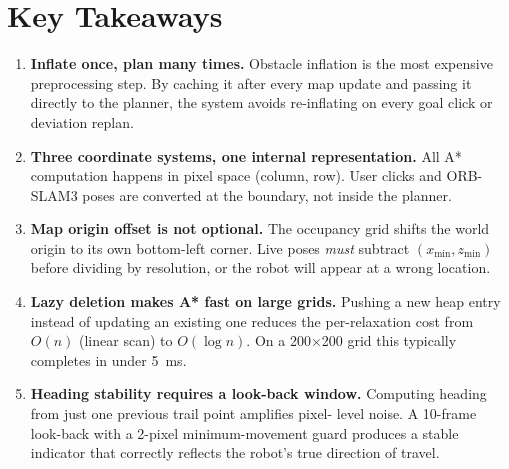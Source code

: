 \documentclass[12pt,a4paper]{article}
\begin{document}
\section{Key Takeaways}

\begin{enumerate}[label=\textbf{\arabic*.}]

  \item \textbf{Inflate once, plan many times.}
        Obstacle inflation is the most expensive preprocessing step.
        By caching it after every map update and passing it directly to the
        planner, the system avoids re-inflating on every goal click or
        deviation replan.

  \item \textbf{Three coordinate systems, one internal representation.}
        All A* computation happens in pixel space (column, row).
        User clicks and ORB-SLAM3 poses are converted at the boundary,
        not inside the planner.

  \item \textbf{Map origin offset is not optional.}
        The occupancy grid shifts the world origin to its own bottom-left
        corner. Live poses \emph{must} subtract $(x_{\min}, z_{\min})$ before
        dividing by resolution, or the robot will appear at a wrong location.

  \item \textbf{Lazy deletion makes A* fast on large grids.}
        Pushing a new heap entry instead of updating an existing one reduces
        the per-relaxation cost from $O(n)$ (linear scan) to $O(\log n)$.
        On a 200$\times$200 grid this typically completes in under 5~ms.

  \item \textbf{Heading stability requires a look-back window.}
        Computing heading from just one previous trail point amplifies pixel-
        level noise. A 10-frame look-back with a 2-pixel minimum-movement
        guard produces a stable indicator that correctly reflects the robot's
        true direction of travel.

\end{enumerate}
\end{document}
